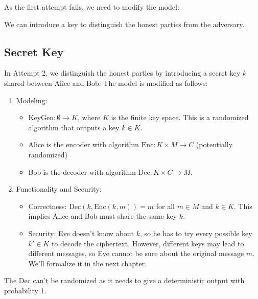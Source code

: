 As the first attempt fails, we need to modify the model:
\begin{remark}
	We can introduce a key to distinguish the honest parties from the adversary.
\end{remark}

\subsection{Secret Key}

In Attempt 2, we distinguish the honest parties by introducing a secret key $k$ shared between Alice and Bob. The model is modified as follows:

\begin{enumerate}
	\item Modeling:
	      \begin{itemize}
		      \item $\text{KeyGen}: \emptyset \to K$, where $K$ is the finite key space. This is a randomized algorithm that outputs a key $k \in K$.
		      \item Alice is the encoder with algorithm $\text{Enc}: K \times M \to C$ (potentially randomized)
		      \item Bob is the decoder with algorithm $\text{Dec}: K\times C \to M$.
	      \end{itemize}
	\item Functionality and Security:
	      \begin{itemize}
		      \item Correctness: $\text{Dec}(k,\text{Enc}(k,m)) = m$ for all $m \in M$ and $k \in K$. This implies Alice and Bob must share the same key $k$.
		      \item Security: Eve doesn't know about $k$, so he has to try every possible key $k' \in K$ to decode the ciphertext. However, different keys may lead to different messages, so Eve cannot be sure about the original message $m$. We'll formalize it in the next chapter.
	      \end{itemize}
\end{enumerate}
\begin{note}
	The $\text{Dec}$ can't be randomized as it needs to give a deterministic output with probability 1.
\end{note}

